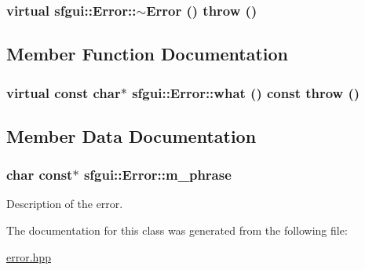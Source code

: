 \hypertarget{classsfgui_1_1Error_fb2a732879909cf082f89002c0f03981}{
\subsubsection[$\sim$Error]{\setlength{\rightskip}{0pt plus 5cm}virtual sfgui::Error::$\sim$Error ()  throw ()}}
\label{classsfgui_1_1Error_fb2a732879909cf082f89002c0f03981}




\subsection{Member Function Documentation}
\hypertarget{classsfgui_1_1Error_7e169ba3f26b7585d292bec5a253b8ec}{
\subsubsection[what]{\setlength{\rightskip}{0pt plus 5cm}virtual const char$\ast$ sfgui::Error::what () const  throw ()}}
\label{classsfgui_1_1Error_7e169ba3f26b7585d292bec5a253b8ec}




\subsection{Member Data Documentation}
\hypertarget{classsfgui_1_1Error_2acba2e2ab334cd94bf392f26f9207ff}{
\subsubsection[m\_\-phrase]{\setlength{\rightskip}{0pt plus 5cm}char const$\ast$ {\bf sfgui::Error::m\_\-phrase}}}
\label{classsfgui_1_1Error_2acba2e2ab334cd94bf392f26f9207ff}


Description of the error. 



The documentation for this class was generated from the following file:\begin{CompactItemize}
\item 
\hyperlink{error_8hpp}{error.hpp}\end{CompactItemize}
